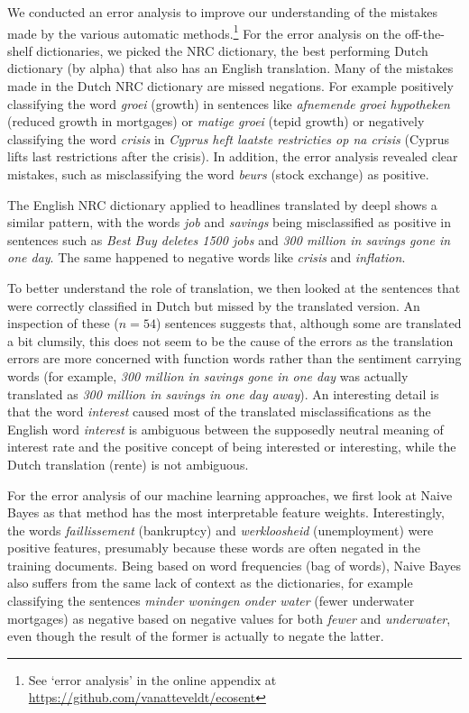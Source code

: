 \newcommand{\fnerroranalysis}{\footnote{%
See `error analysis' in the online appendix at \url{https://github.com/vanatteveldt/ecosent}%
}}

\newcommand{\trans}[2]{\emph{#1} (#2)}

We conducted an error analysis to improve our understanding of the mistakes made by the various automatic methods.\fnerroranalysis{} 
For the error analysis on the off-the-shelf dictionaries, we picked the NRC dictionary, 
the best performing Dutch dictionary (by alpha) that also has an English translation. 
Many of the mistakes made in the Dutch NRC dictionary are missed negations. 
For example positively classifying the word \trans{groei}{growth} in sentences like \trans{afnemende groei hypotheken}{reduced growth in mortgages}  or \trans{matige groei}{tepid growth} or negatively classifying the word \emph{crisis} in \trans{Cyprus heft laatste restricties op na crisis}{Cyprus lifts last restrictions after the crisis}. 
In addition, the error analysis revealed  clear mistakes, such as misclassifying the word \trans{beurs}{stock exchange} as positive. 

The English NRC dictionary applied to headlines translated by deepl shows a similar pattern, with the words \emph{job} and \emph{savings} being misclassified as positive in sentences such as \emph{Best Buy deletes 1500 jobs} and \emph{300 million in savings gone in one day}. The same happened to negative words like \emph{crisis} and \emph{inflation}. 

To better understand the role of translation, we then looked at the sentences that were correctly classified in Dutch but missed by the translated version. An inspection of these ($n=54$) sentences suggests that, although some are translated a bit clumsily, this does not seem to be the cause of the errors as the translation errors are more concerned with function words rather than the sentiment carrying words (for example, \emph{300 million in savings gone in one day} was actually translated as \emph{300 million in savings in one day away}). An interesting detail is that the word \emph{interest} caused most of the translated misclassifications as the English word \emph{interest} is ambiguous between the supposedly neutral meaning of interest rate and the positive concept of being interested or interesting, while the Dutch translation (rente) is not ambiguous. 

For the error analysis of our machine learning approaches, we first look at Naive Bayes as that method has the most interpretable feature weights. Interestingly, the words \trans{faillissement}{bankruptcy} and \trans{werkloosheid}{unemployment} were positive features, presumably because these words are often negated in the training documents. Being based on word frequencies (bag of words), Naive Bayes also suffers from the same lack of context as the dictionaries, for example classifying the sentences \trans{minder woningen onder water}{fewer underwater mortgages} as negative based on negative values for both \emph{fewer} and \emph{underwater}, even though the result of the former is actually to negate the latter. 

